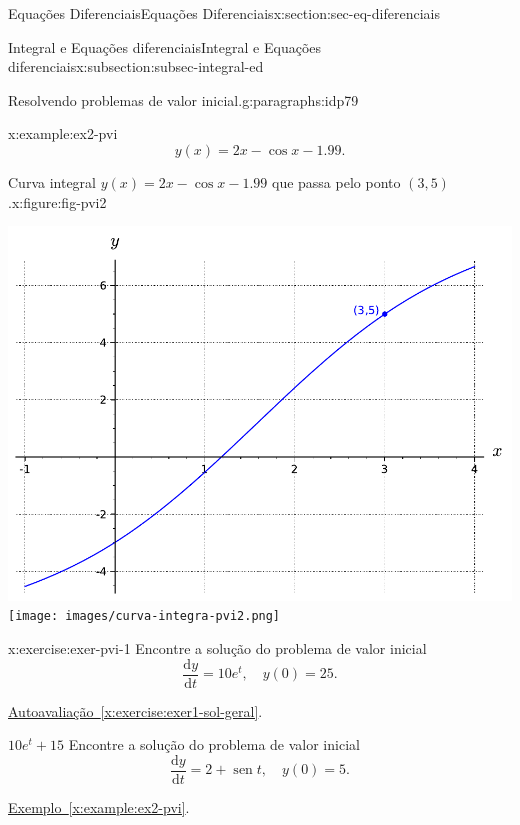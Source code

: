 \documentclass[oneside,10pt,]{article}
\newcommand{\xreffont}{\relax}
\numberwithin{equation}{section}
\newcommand{\dd}{\mathrm{d}}
\DeclareMathOperator{\sin}{sen}
\begin{document}
\begin{sectionptx}{Equações Diferenciais}{}{Equações Diferenciais}{}{}{x:section:sec-eq-diferenciais}
\begin{subsectionptx}{Integral e Equações diferenciais}{}{Integral e Equações diferenciais}{}{}{x:subsection:subsec-integral-ed}
\begin{paragraphs}{Resolvendo problemas de valor inicial.}{g:paragraphs:idp79}
\begin{example}{}{x:example:ex2-pvi}
\begin{equation*}
y(x)= 2x - \cos{x} - 1.99\text{.}
\end{equation*}
\begin{figureptx}{Curva integral \(y(x)= 2x - \cos{x} - 1.99\) que passa pelo ponto \((3,5)\).}{x:figure:fig-pvi2}{}%
\begin{image}{0.25}{0.5}{0.25}%
%
{\includegraphics[width=\linewidth]{images/curva-integra-pvi2.pdf}}%
{\texttt{[image: images/curva-integra-pvi2.png]}}
\end{image}%
\tcblower
\end{figureptx}%
%
\end{example}
\begin{inlineexercise}{}{x:exercise:exer-pvi-1}%
Encontre a solução do problema de valor inicial%
\begin{equation*}
\frac{\dd y}{\dd t}=10e^t, \quad y(0)=25\text{.}
\end{equation*}
%
\par\smallskip%
\noindentRevise \hyperref[x:exercise:exer1-sol-geral]{Autoavaliação~{\xreffont\ref{x:exercise:exer1-sol-geral}}}.%
\par\smallskip%
\noindent\(10e^t + 15\)%
Encontre a solução do problema de valor inicial%
\begin{equation*}
\frac{\dd y}{\dd t} = 2+ \sin{t}, \quad  y(0)=5\text{.}
\end{equation*}
%
\par\smallskip%
\noindentRevise \hyperref[x:example:ex2-pvi]{Exemplo~{\xreffont\ref{x:example:ex2-pvi}}}.%
\par\smallskip%

\end{inlineexercise}
\end{paragraphs}
\end{subsectionptx}
\end{sectionptx}
\end{document}
